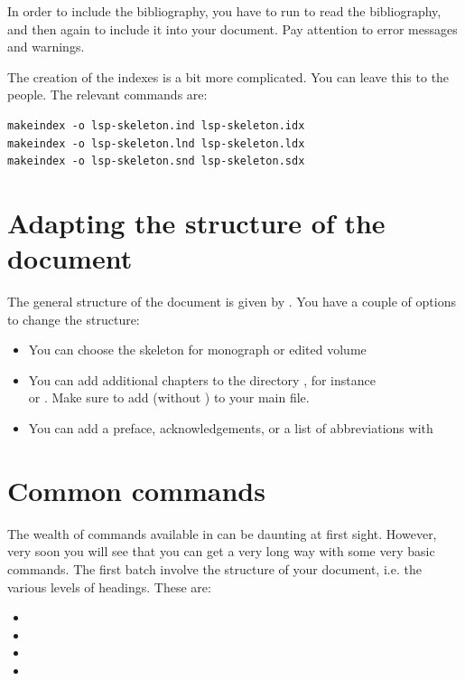 In order to include the bibliography, you have to run  to read the bibliography, and then again  to include it into your document. Pay attention to error messages and warnings.

\newpage
The creation of the indexes is a bit more complicated. You can leave this to the \lsp people. The relevant commands are:

\begin{verbatim}
makeindex -o lsp-skeleton.ind lsp-skeleton.idx
makeindex -o lsp-skeleton.lnd lsp-skeleton.ldx 
makeindex -o lsp-skeleton.snd lsp-skeleton.sdx
\end{verbatim} 


\section{Adapting the structure of the document}
The general structure of the document is given by \lsp. You have a couple of options to change the structure:
\begin{itemize}
 \item You can choose the skeleton for monograph or edited volume
 \item You can add additional chapters to the directory , for instance\\  or . Make sure to add  (without ) to your main file.
 \item You can add a preface, acknowledgements, or a list of abbreviations with\\ 
 \end{itemize}



\section{Common commands}\label{sec:latex:commoncommands}
The wealth of commands available in \latex can be daunting at first sight. However, very soon you will see that you can get a very long way with some very basic commands. The first batch involve the structure of your document, i.e. the various levels of headings. These are:
\begin{itemize}
 \item {}
\item {}
\item {}
\item {}
\end{itemize}

